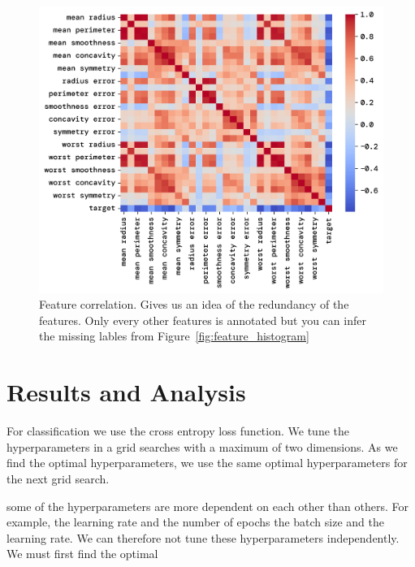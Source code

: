 \documentclass[twoside,11pt]{report}
\begin{document}
    \begin{figure}
        \begin{center}
            \includegraphics[width=\textwidth]{../runsAndFigures/feature_correlation.png}
        \end{center}
        \caption{Feature correlation. Gives us an idea of the redundancy of the features.
            Only every other features is annotated but you can infer the missing lables 
        from Figure~\ref{fig:feature_histogram}}\label{fig:feature_correlation}
    \end{figure}



\clearpage

\section{Results and Analysis}
\label{sec:resultsdiscussion}

    For classification we use the cross entropy loss function. 
    We tune the hyperparameters in a grid searches with a maximum
    of two dimensions. As we find the optimal hyperparameters, we use the same optimal hyperparameters for the next grid search.

    some of the hyperparameters are more dependent on each other than others. For example, the learning rate and the number of epochs
    the batch size and the learning rate. We can therefore not tune these hyperparameters independently. We must first find the optimal
\end{document}
